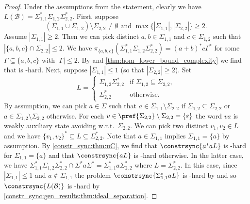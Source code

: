 \begin{proof}	
	Under the assumptions from the statement, clearly 
	we have $L(\mathcal B) = \Sigma_{1,1}^* \Sigma_{1,2} \Sigma_{2,2}^*$.
	First, suppose
	\[
	(\Sigma_{1,1} \cup \Sigma_{1,2}) \setminus \Sigma_{2,2} \ne \emptyset
	\text{ and }
	\max\{|\Sigma_{1,1}|, |\Sigma_{2,2}|\} \ge 2.
	\]
	Assume $|\Sigma_{1,1}| \ge 2$.
	Then we can pick distinct $a,b \in \Sigma_{1,1}$
    and $c \in \Sigma_{1,2}$ such that $|\{a,b,c\} \cap \Sigma_{2,2}| \le 2$.  
    We have $\pi_{\{a,b,c\}}(\Sigma_{1,1}^* \Sigma_{1,2} \Sigma_{2,2}^*) = (a+b)^*c\Gamma^*$
    for some $\Gamma \subseteq \{a,b,c\}$ with $|\Gamma| \le 2$.
    By 
    and \cref{thm:hom_lower_bound_complexity} 
    we find that 
    is \PSPACE-hard.
    Next, suppose $|\Sigma_{1,1}| \le 1$ (so that $|\Sigma_{2,2}| \ge 2$).   
    Set 
    \[
    L = \begin{cases}
    	\Sigma_{1,2}\Sigma_{2,2}^* & \text{if } \Sigma_{1,2} \subseteq \Sigma_{2,2}, \\
      	\Sigma_{2,2}^* & \text{otherwise}.
    \end{cases}
    \]
    By assumption, we can pick $a \in \Sigma$
    such that $a \in \Sigma_{1,1} \setminus \Sigma_{2,2}$ if $\Sigma_{1,2} \subseteq \Sigma_{2,2}$
    or $a \in \Sigma_{1,2} \setminus \Sigma_{2,2}$ otherwise.
    For each $v \in \pref{\Sigma_{2,2}} \setminus \Sigma_{2,2} = \{\varepsilon\}$
    the word $va$ is weakly auxiliary state avoiding 
    w.r.t.~$\Sigma_{2,2}$.
    We can pick two distinct $v_1, v_2 \in L$
    and we have $\{v_1, v_2\}^* \subseteq L \subseteq \Sigma_{2,2}^*$.
    Note that $a \in \Sigma_{1,1}$
    implies $\Sigma_{1,1} = \{a\}$ by assumption.
    By \cref{constr_sync:thm:uC}, we find
    that $\constrsync{a^*aL}$
    is \PSPACE-hard for $\Sigma_{1,1} = \{a\}$
    and that $\constrsync{aL}$ is \PSPACE-hard otherwise.
    In the latter case,
    we have $\Sigma_{1,1}^* \Sigma_{1,2} \Sigma_{2,2}^* \cap \Sigma^* a \Sigma^* = \Sigma_{1,1}^* a \Sigma_{2,2}^*$
    where $L = \Sigma_{2,2}^*$. 
    In this case, since $|\Sigma_{1,1}| \le 1$
    and $a \notin \Sigma_{1,1}$
    the problem $\constrsync{\Sigma_{1,1}^* a L}$
    is \PSPACE-hard by 
    and so $\constrsync{L(\mathcal B)}$
    is \PSPACE-hard by \cref{constr_sync:gen_results:thm:ideal_separation}.
%        
%    

\end{proof}
